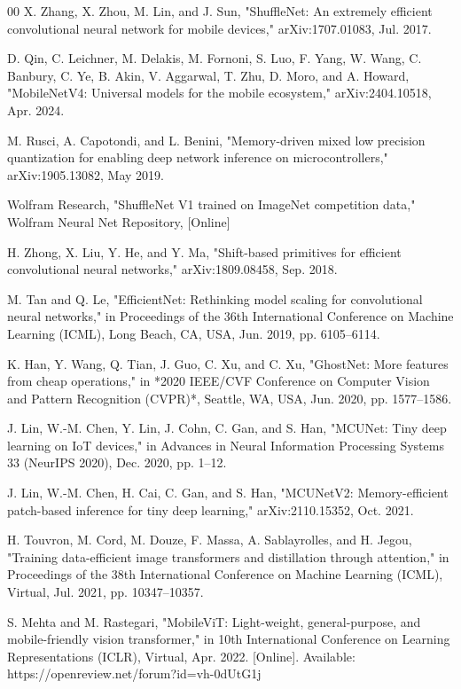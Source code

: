 \documentclass[conference]{IEEEtran}
\begin{document}
\begin{thebibliography}{00}
		X. Zhang, X. Zhou, M. Lin, and J. Sun, "ShuffleNet: An extremely efficient convolutional neural network for mobile devices," arXiv:1707.01083, Jul. 2017.
		
		D. Qin, C. Leichner, M. Delakis, M. Fornoni, S. Luo, F. Yang, W. Wang, C. Banbury, C. Ye, B. Akin, V. Aggarwal, T. Zhu, D. Moro, and A. Howard, "MobileNetV4: Universal models for the mobile ecosystem," arXiv:2404.10518, Apr. 2024.
		
		M. Rusci, A. Capotondi, and L. Benini, "Memory-driven mixed low precision quantization for enabling deep network inference on microcontrollers," arXiv:1905.13082, May 2019.
		
		Wolfram Research, "ShuffleNet V1 trained on ImageNet competition data," Wolfram Neural Net Repository, [Online]
		
		H. Zhong, X. Liu, Y. He, and Y. Ma, "Shift-based primitives for efficient convolutional neural networks," arXiv:1809.08458, Sep. 2018.
		
		M. Tan and Q. Le, "EfficientNet: Rethinking model scaling for convolutional neural networks," in Proceedings of the 36th International Conference on Machine Learning (ICML), Long Beach, CA, USA, Jun. 2019, pp. 6105–6114.
		
		K. Han, Y. Wang, Q. Tian, J. Guo, C. Xu, and C. Xu, "GhostNet: More features from cheap operations," in *2020 IEEE/CVF Conference on Computer Vision and Pattern Recognition (CVPR)*, Seattle, WA, USA, Jun. 2020, pp. 1577–1586.
		
		J. Lin, W.-M. Chen, Y. Lin, J. Cohn, C. Gan, and S. Han, "MCUNet: Tiny deep learning on IoT devices," in Advances in Neural Information Processing Systems 33 (NeurIPS 2020), Dec. 2020, pp. 1–12.
		
		J. Lin, W.-M. Chen, H. Cai, C. Gan, and S. Han, "MCUNetV2: Memory-efficient patch-based inference for tiny deep learning," arXiv:2110.15352, Oct. 2021.
		
		H. Touvron, M. Cord, M. Douze, F. Massa, A. Sablayrolles, and H. Jegou, "Training data-efficient image transformers and distillation through attention," in Proceedings of the 38th International Conference on Machine Learning (ICML), Virtual, Jul. 2021, pp. 10347–10357.
		
		S. Mehta and M. Rastegari, "MobileViT: Light-weight, general-purpose, and mobile-friendly vision transformer," in 10th International Conference on Learning Representations (ICLR), Virtual, Apr. 2022. [Online]. Available: https://openreview.net/forum?id=vh-0dUtG1j
		

\end{thebibliography}
\end{document}
